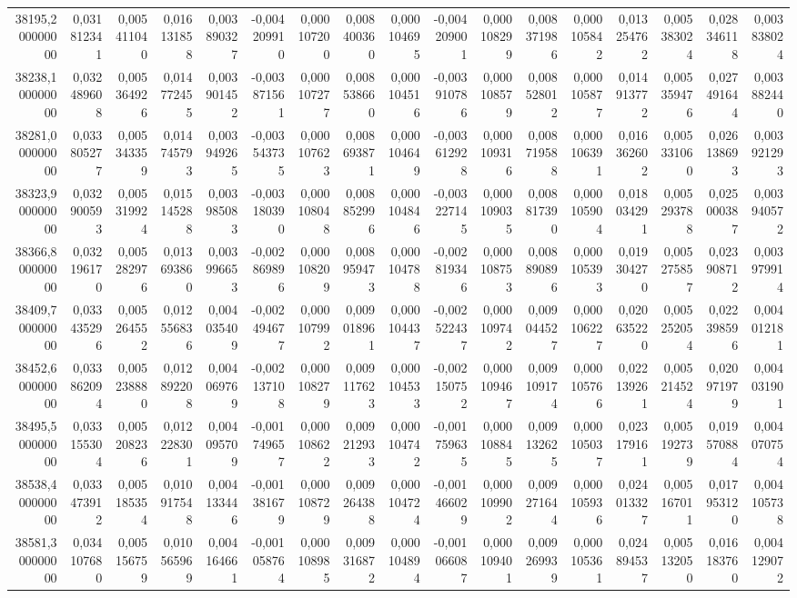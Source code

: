 \begin{longtable}{rrrrrrrrrrrrrrrrr}
38195,200000000 & 0,031812341 & 0,005411040 & 0,016131858 & 0,003890327 & -0,004209910 & 0,000107200 & 0,008400360 & 0,000104695 & -0,004209001 & 0,000108299 & 0,008371986 & 0,000105842 & 0,013254762 & 0,005383024 & 0,028346118 & 0,003838024\\
38238,100000000 & 0,032489608 & 0,005364926 & 0,014772455 & 0,003901452 & -0,003871561 & 0,000107277 & 0,008538660 & 0,000104516 & -0,003910786 & 0,000108579 & 0,008528012 & 0,000105877 & 0,014913772 & 0,005359476 & 0,027491644 & 0,003882440\\
38281,000000000 & 0,033805277 & 0,005343359 & 0,014745793 & 0,003949265 & -0,003543735 & 0,000107623 & 0,008693871 & 0,000104649 & -0,003612928 & 0,000109316 & 0,008719588 & 0,000106391 & 0,016362602 & 0,005331060 & 0,026138693 & 0,003921293\\
38323,900000000 & 0,032900593 & 0,005319924 & 0,015145288 & 0,003985083 & -0,003180390 & 0,000108048 & 0,008852996 & 0,000104846 & -0,003227145 & 0,000109035 & 0,008817390 & 0,000105904 & 0,018034291 & 0,005293788 & 0,025000387 & 0,003940572\\
38366,800000000 & 0,032196170 & 0,005282976 & 0,013693860 & 0,003996653 & -0,002869896 & 0,000108209 & 0,008959473 & 0,000104788 & -0,002819346 & 0,000108753 & 0,008890896 & 0,000105393 & 0,019304270 & 0,005275857 & 0,023908712 & 0,003979914\\
38409,700000000 & 0,033435296 & 0,005264552 & 0,012556836 & 0,004035409 & -0,002494677 & 0,000107992 & 0,009018961 & 0,000104437 & -0,002522437 & 0,000109742 & 0,009044527 & 0,000106227 & 0,020635220 & 0,005252054 & 0,022398596 & 0,004012181\\
38452,600000000 & 0,033862094 & 0,005238880 & 0,012892208 & 0,004069769 & -0,002137108 & 0,000108279 & 0,009117623 & 0,000104533 & -0,002150752 & 0,000109467 & 0,009109174 & 0,000105766 & 0,022139261 & 0,005214524 & 0,020971979 & 0,004031901\\
38495,500000000 & 0,033155304 & 0,005208236 & 0,012228301 & 0,004095709 & -0,001749657 & 0,000108622 & 0,009212933 & 0,000104742 & -0,001759635 & 0,000108845 & 0,009132625 & 0,000105037 & 0,023179161 & 0,005192739 & 0,019570884 & 0,004070754\\
38538,400000000 & 0,033473912 & 0,005185354 & 0,010917548 & 0,004133446 & -0,001381679 & 0,000108729 & 0,009264388 & 0,000104724 & -0,001466029 & 0,000109902 & 0,009271644 & 0,000105936 & 0,024013327 & 0,005167011 & 0,017953120 & 0,004105738\\
38581,300000000 & 0,034107680 & 0,005156759 & 0,010565969 & 0,004164661 & -0,001058764 & 0,000108985 & 0,009316872 & 0,000104894 & -0,001066087 & 0,000109401 & 0,009269939 & 0,000105361 & 0,024894537 & 0,005132050 & 0,016183760 & 0,004129072\\

\end{longtable}
